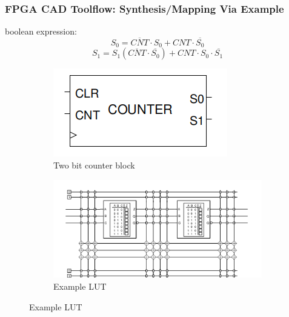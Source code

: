 \documentclass{beamer}
\begin{document}
\begin{frame}[fragile]
  \frametitle{FPGA CAD Toolflow: Synthesis/Mapping Via Example}
  boolean expression:
   \[{S}_0 = \overline{CNT}\cdot{S}_0+ CNT \cdot \overline{{S}_0} \]
   \[{S}_1  ={S}_1 (\overline{CNT} \cdot\overline{{S}_0}) + CNT\cdot{S}_0\cdot\overline{{S}_1} \]
    \begin{figure}[h]
        \begin{subfigure}{.5\textwidth}
            \includegraphics[width=0.9\linewidth]{slides/images/basic_block.png} 
             \caption{Two bit counter block}
             \label{fig:subim1}
        \end{subfigure}
        \begin{subfigure}{.5\textwidth}
             \includegraphics[width=0.9\linewidth]{slides/images/LUT.png}
             \caption{Example LUT }
             \label{fig:subim2}
             \end{subfigure}
    \end{figure}
\end{frame}
\end{document}
